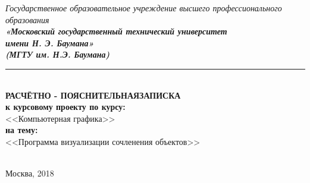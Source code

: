 \begin{titlepage}
\begin{center}
 \hfill \break
 \textit{
  \normalsize{Государственное образовательное учреждение высшего профессионального образования}}\\ 
 
 \textit{
  \normalsize  {\bf  «Московский государственный технический университет}\\ 
  \normalsize  {\bf имени Н. Э. Баумана»}\\
  \normalsize  {\bf (МГТУ им. Н.Э. Баумана)}\\
 }
 \noindent\rule{\textwidth}{2pt}
 \hfill \break
 \noindent
 \\
 \noindent
    \vfill
 \normalsize{\bf РАСЧЁТНО - ПОЯСНИТЕЛЬНАЯ\space\space ЗАПИСКА}\\ \vspace{5mm}
    \normalsize{\bf к курсовому проекту по курсу:}\\ \vspace{5mm}
    \large{<<Компьютерная графика>>}\\ \vspace{5mm}
    \normalsize{\bf на тему:}\\\vspace{5mm}
    \large{<<Программа визуализации сочленения объектов>>}\\
    \vfill
 \normalsize {
  \noindent
  \makebox[\textwidth][c]{}%
        \noindent
  \makebox[\textwidth][c]{}%
 }\\
\vfill
\end{center}
\vfill
\begin{center} Москва, 2018\end{center}
\end{titlepage}